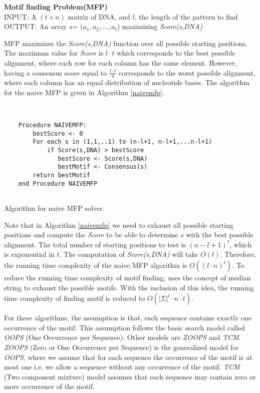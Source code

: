\documentclass{llncs}
\begin{document}
{\begin{definition} \label{mfpDefinition} \textbf{Motif finding Problem(MFP)} \\
\noindent INPUT: A $(t \times n)$ matrix of DNA, and $l$, the length of the pattern to find\\
OUTPUT: An array $s$= ($a_1, a_2, . . . , a_t$) maximizing \textit{Score(s,DNA)}
\end{definition}

MFP maximizes the \textit{Score(s,DNA)} function over all possible starting positions. The maximum value for \textit{Score} is $l \cdot t$ which corresponds to the best possible alignment, where each row for each column has the same element. However, having a consensus score equal to $\frac{l \cdot t}{4}$ corresponds to the worst possible alignment, where each column has an equal distribution of nucleotide bases. The algorithm for the naive MFP is given in Algorithm \ref{naivemfp}. 

\begin{algorithm}\label{naivemfp}
~\\
\begin{verbatim}    
    Procedure NAIVEMFP:
        bestScore <- 0
        For each s in (1,1,..1) to (n-l+1, n-l+1,...n-l+1)
        	if Score(s,DNA) > bestScore
    	       bestScore <- Score(s,DNA)
    	       bestMotif <- Consensus(s)
        return bestMotif
    end Procedure NAIVEMFP	
	
\end{verbatim}	
\caption{Algorithm for naive MFP solver.}
\end{algorithm}

Note that in Algorithm \ref{naivemfp} we need to exhaust all possible starting positions and compute the \textit{Score} to be able to determine $s$ with the best possible alignment. The total number of starting positions to test is $(n-l+1)^t$, which is exponential in $t$. The computation of \textit{Score(s,DNA)} will take $O(l)$. Therefore, the running time complexity of the naive MFP algorithm is $O((l \cdot n)^t)$.
To reduce the running time complexity of motif finding, \cite{pevznerBook} uses the concept of median string to exhaust the possible motifs. With the inclusion of this idea, the running time complexity of finding motif  is reduced to $O(|\Sigma|^l \cdot n \cdot t)$.

For these algorithms, the assumption is that, each sequence contains exactly one occurrence of the motif. This assumption follows the basic search model called \textit{OOPS} (One Occurrence per Sequence). Other models are \textit{ZOOPS} and \textit{TCM}.\textit{ ZOOPS} (Zero or One Occurrence per Sequence) is the generalized model for \textit{OOPS}, where we assume that for each sequence the occurrence of the motif is at most one i.e. we allow a sequence without any occurrence of the motif. \textit{TCM} (Two component mixture) model assumes that each sequence may contain zero or more occurrence of the motif. 

}
\end{document}

